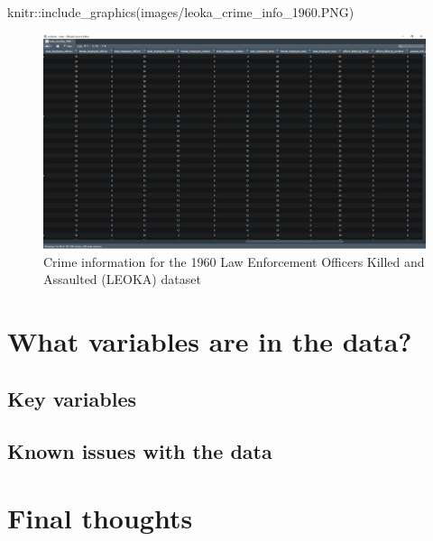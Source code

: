 \documentclass[
  12pt,
  openany]{book}
\newenvironment{Shaded}{\begin{snugshade}}{\end{snugshade}}
\newcommand{\FunctionTok}[1]{\textcolor[rgb]{0,0,0}{#1}}
\newcommand{\NormalTok}[1]{#1}
\newcommand{\SpecialCharTok}[1]{\textcolor[rgb]{0,0,0}{#1}}
\newcommand{\StringTok}[1]{\textcolor[rgb]{0.5,0.5,0.5}{#1}}
\begin{document}
\begin{Shaded}
\begin{Highlighting}[]
\NormalTok{knitr}\SpecialCharTok{::}\FunctionTok{include\_graphics}\NormalTok{(}\StringTok{\textquotesingle{}images/leoka\_crime\_info\_1960.PNG\textquotesingle{}}\NormalTok{)}
\end{Highlighting}
\end{Shaded}

\begin{figure}
\includegraphics[width=26.64in]{images/leoka_crime_info_1960} \caption{Crime information for the 1960 Law Enforcement Officers Killed and Assaulted (LEOKA) dataset}\label{fig:unnamed-chunk-3}
\end{figure}

\hypertarget{what-variables-are-in-the-data-2}{%
\section{What variables are in the data?}\label{what-variables-are-in-the-data-2}}

\hypertarget{key-variables-2}{%
\subsection{Key variables}\label{key-variables-2}}

\hypertarget{known-issues-with-the-data-2}{%
\subsection{Known issues with the data}\label{known-issues-with-the-data-2}}

\hypertarget{final-thoughts-2}{%
\section{Final thoughts}\label{final-thoughts-2}}
\end{document}

